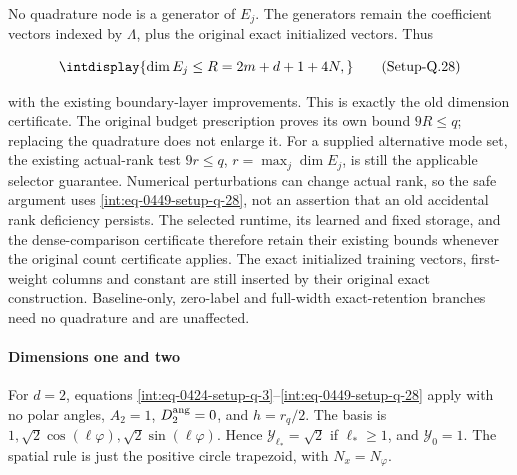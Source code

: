 
No quadrature node is a generator of \(E_j\). The generators remain the coefficient vectors indexed by \(\Lambda\), plus the original exact initialized vectors. Thus


\label{int:eq-setup-q-28}
\begingroup\renewcommand{\theHequation}{intdisplay.901}
\begin{equation}
\intdisplay{
\dim E_j\le R=2m+d+1+4N,
}
\tag{Setup-Q.28}
\label{int:eq-0449-setup-q-28}
\end{equation}
\endgroup


with the existing boundary-layer improvements. This is exactly the old dimension certificate. The original budget prescription proves its own bound \(9R\le q\); replacing the quadrature does not enlarge it. For a supplied alternative mode set, the existing actual-rank test \(9r\le q\), \(r=\max_j\dim E_j\), is still the applicable selector guarantee. Numerical perturbations can change actual rank, so the safe argument uses \hyperref[int:eq-setup-q-28]{\eqref{int:eq-0449-setup-q-28}}, not an assertion that an old accidental rank deficiency persists. The selected runtime, its learned and fixed storage, and the dense-comparison certificate therefore retain their existing bounds whenever the original count certificate applies. The exact initialized training vectors, first-weight columns and constant are still inserted by their original exact construction. Baseline-only, zero-label and full-width exact-retention branches need no quadrature and are unaffected.


\paragraph{Dimensions one and two}
\label{int:setup-quadrature-5}
\mbox{}\par\smallskip


For \(d=2\), equations \hyperref[int:eq-setup-q-3]{\eqref{int:eq-0424-setup-q-3}}--\allowbreak \hyperref[int:eq-setup-q-28]{\eqref{int:eq-0449-setup-q-28}} apply with no polar angles, \(A_2=1\), \(D_2^{\rm ang}=0\), and \(h=r_q/2\). The basis is \(1,\allowbreak \sqrt2\cos(\ell\varphi),\allowbreak  \sqrt2\sin(\ell\varphi)\). Hence \(\mathcal Y_{\ell_*}=\sqrt2\) if \(\ell_*\ge1\), and \(\mathcal Y_0=1\). The spatial rule is just the positive circle trapezoid, with \(N_x=N_\varphi\).


